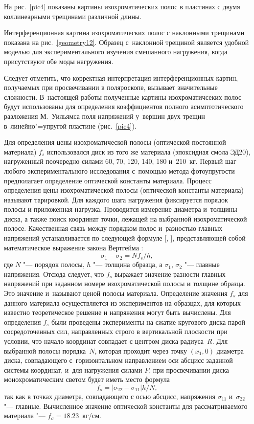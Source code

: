 На рис.~\ref{pic4} показаны картины изохроматических полос в пластинах с двумя коллинеарными трещинами различной длины.

Интерференционная картина изохроматических полос с наклонными трещинами показана на рис.~\ref{geometry12}. 
Образец с~наклонной трещиной является удобной моделью для экспериментального изучения смешанного нагружения, когда присутствуют обе моды нагружения.


Следует отметить, что корректная интерпретация интерференционных картин, получаемых при просвечивании в поляроскопе, вызывает значительные сложности. 
В~настоящей работы полученные картины изохроматичсеких полос будут использованы для определения коэффициентов полного асимптотического разложения М.~Уильямса поля напряжений у~вершин двух трещин в~линейно"=упругой пластине (рис.~\ref{pic4}).


Для определения цены изохроматической полосы (оптической постоянной материала) $f_s$ использовался  диск из того же материала (эпоксидная смола ЭД20), нагруженный поочередно силами 60, 70, 120, 140, 180 и~210~кг.
Первый шаг любого экспериментального исследования с~помощью метода фотоупругости предполагает определение оптической константы материала.
Процесс определения цены изохроматической полосы (оптической константы материала) называют тарировкой. 
Для каждого шага нагружения фиксируется порядок полосы и приложенная нагрузка. 
Проводится измерение диаметра и~толщины диска, а также поиск координат точки, лежащей на выбранной изохроматической полосе. 
Качественная связь между порядком полос и~разностью главных напряжений устанавливается по следующей формуле  [, ], представляющей собой математическое выражение закона Вертгейма \cite{Raz}:
\begin{equation}
  \sigma_{1}-\sigma_{2}=Nf_s/h,
  \label{oml}
\end{equation}
где $N$ "--- порядок полосы, $h$ "--- толщина образца, а $\sigma_{1}$, $\sigma_{2}$ "--- главные напряжения.
Отсюда следует, что $f_s$ выражает  значение разности главных напряжений при заданном номере изохроматической полосы и толщине образца. 
Это значение и~называют ценой полосы материала.
Определение значения $f_s$ для данного материала осуществляется из экспериментов на образцах, для которых известно теоретическое решение и напряжения могут быть вычислены. 
Для определения $f_s$ были проведены эксперименты на сжатие кругового диска парой сосредоточенных сил, направленных строго в вертикальной плоскости при условии, что начало координат совпадает с центром диска радиуса~$R$.
Для выбранной полосы порядка~$N$, которая проходит через точку $(x_1,0)$ диаметра диска, совпадающего с~горизонтальном направлением оси абсцисс заданной системы координат, и~для нагружения силами $P$, при просвечивании диска монохроматическим светом будет иметь место формула
\begin{equation}
  f_s=|\sigma_{22}-\sigma_{11}|h/N,
\end{equation}
так как в точках диаметра, совпадающего с осью абсцисс, напряжения $\sigma_{11}$ и~$\sigma_{22}$ "--- главные.
Вычисленное значение оптической константы для рассматриваемого  материала "--- $f_\sigma=18.23$~кг/см.


